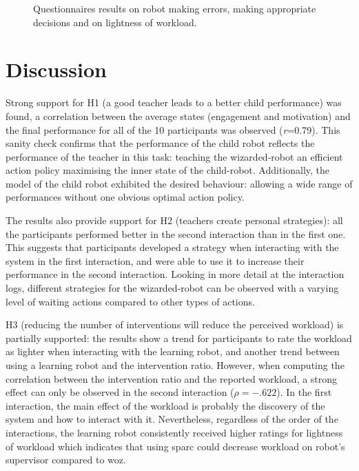 \begin{figure}[ht]
\begin{subfigure}[t]{0.3295\textwidth}
	\end{subfigure}
	\caption{Questionnaires results on robot making errors, making appropriate decisions and on lightness of workload.}
	\label{fig:woz_quest}
\end{figure}


\section{Discussion}


Strong support for H1 (a good teacher leads to a better child performance) was found, a correlation between the average states (engagement and motivation) and the final performance for all of the 10 participants was observed (\textit{r}=0.79). This sanity check confirms that the performance of the child robot reflects the performance of the teacher in this task: teaching the wizarded-robot an efficient action policy maximising the inner state of the child-robot. Additionally, the model of the child robot exhibited the desired behaviour: allowing a wide range of performances without one obvious optimal action policy.

The results also provide support for H2 (teachers create personal strategies): all the participants performed better in the second interaction than in the first one. This suggests that participants developed a strategy when interacting with the system in the first interaction, and were able to use it to increase their performance in the second interaction. Looking in more detail at the interaction logs, different strategies for the wizarded-robot can be observed with a varying level of waiting actions compared to other types of actions.

H3 (reducing the number of interventions will reduce the perceived workload) is partially supported: the results show a trend for participants to rate the workload as lighter when interacting with the learning robot, and another trend between using a learning robot and the intervention ratio. However, when computing the correlation between the intervention ratio and the reported workload, a strong effect can only be observed in the second interaction ($\rho = -.622$). In the first interaction, the main effect of the workload is probably the discovery of the system and how to interact with it. Nevertheless, regardless of the order of the interactions, the learning robot consistently received higher ratings for lightness of workload which indicates that using \gls{sparc} could decrease workload on robot's supervisor compared to \gls{woz}.

